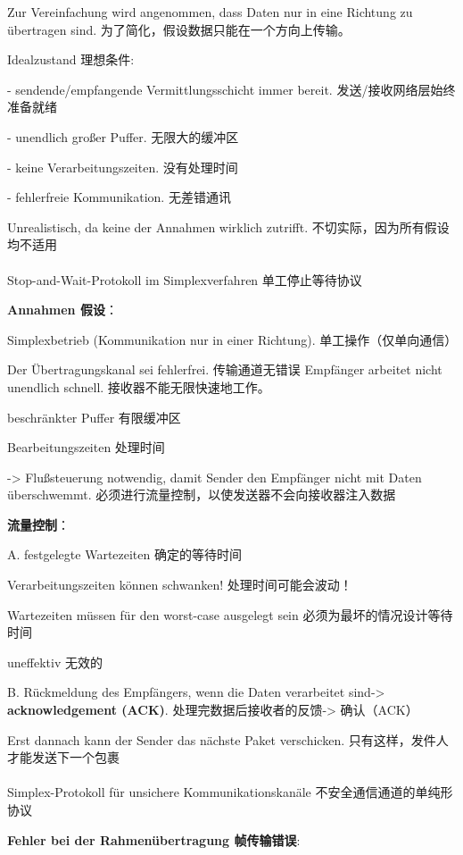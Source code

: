 \documentclass[fleqn]{article}
\begin{document}
Zur Vereinfachung wird angenommen, dass Daten nur in eine Richtung zu übertragen sind.
为了简化，假设数据只能在一个方向上传输。

Idealzustand 理想条件:

- sendende/empfangende Vermittlungsschicht immer bereit. 发送/接收网络层始终准备就绪

- unendlich großer Puffer. 无限大的缓冲区

- keine Verarbeitungszeiten. 没有处理时间

- fehlerfreie Kommunikation. 无差错通讯

Unrealistisch, da keine der Annahmen wirklich zutrifft. 不切实际，因为所有假设均不适用
\\
\\
 Stop-and-Wait-Protokoll im Simplexverfahren 单工停止等待协议

\noindent \textbf{Annahmen 假设}：

Simplexbetrieb (Kommunikation nur in einer Richtung). 单工操作（仅单向通信）

Der Übertragungskanal sei fehlerfrei. 传输通道无错误
Empfänger arbeitet nicht unendlich schnell. 接收器不能无限快速地工作。
 
\qquad beschränkter Puffer 有限缓冲区

\qquad Bearbeitungszeiten 处理时间

 -> Flußsteuerung notwendig, damit Sender den Empfänger nicht mit Daten überschwemmt. 必须进行流量控制，以使发送器不会向接收器注入数据

\textbf{流量控制}：

A. festgelegte Wartezeiten 确定的等待时间

\qquad Verarbeitungszeiten können schwanken! 处理时间可能会波动！

\qquad Wartezeiten müssen für den worst-case ausgelegt sein 必须为最坏的情况设计等待时间 

\qquad uneffektiv 无效的 

B. Rückmeldung des Empfängers, wenn die Daten verarbeitet sind-> \textbf{acknowledgement (ACK)}. 处理完数据后接收者的反馈-> 确认（ACK）

\qquad Erst dannach kann der Sender das nächste Paket verschicken. 只有这样，发件人才能发送下一个包裹
\\
\\
 Simplex-Protokoll für unsichere Kommunikationskanäle 不安全通信通道的单纯形协议

\noindent \textbf{Fehler bei der Rahmenübertragung 帧传输错误}:
\end{document}
